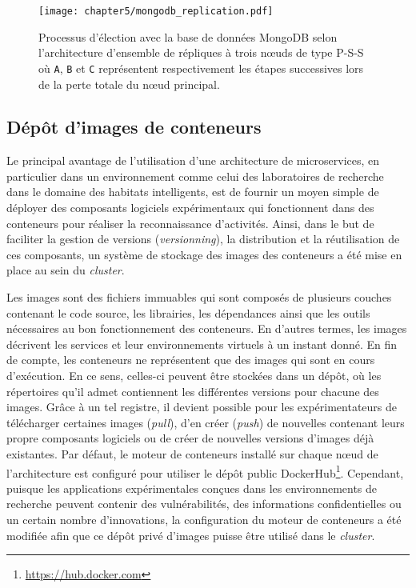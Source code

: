 \begin{figure}[H]
	\centering
	\texttt{[image: chapter5/mongodb\_replication.pdf]}
        \caption{Processus d'élection avec la base de données MongoDB selon l'architecture d'ensemble de répliques à trois n\oe{}uds de type P-S-S où \texttt{A}, \texttt{B} et \texttt{C} représentent respectivement les étapes successives lors de la perte totale du n\oe{}ud principal.}
	\label{fig:mongodb_replication}
\end{figure}

\subsection{Dépôt d'images de conteneurs}

Le principal avantage de l'utilisation d'une architecture de microservices, en particulier dans un environnement comme celui des laboratoires de recherche dans le domaine des habitats intelligents, est de fournir un moyen simple de déployer des composants logiciels expérimentaux qui fonctionnent dans des conteneurs pour réaliser la reconnaissance d'activités. Ainsi, dans le but de faciliter la gestion de versions (\textit{versionning}), la distribution et la réutilisation de ces composants, un système de stockage des images des conteneurs a été mise en place au sein du \textit{cluster}.

Les images sont des fichiers immuables qui sont composés de plusieurs couches contenant le code source, les librairies, les dépendances ainsi que les outils nécessaires au bon fonctionnement des conteneurs. En d'autres termes, les images décrivent les services et leur environnements virtuels à un instant donné. En fin de compte, les conteneurs ne représentent que des images qui sont en cours d'exécution. En ce sens, celles-ci peuvent être stockées dans un dépôt, où les répertoires qu'il admet contiennent les différentes versions pour chacune des images. Grâce à un tel registre, il devient possible pour les expérimentateurs de télécharger certaines images (\textit{pull}), d'en créer (\textit{push}) de nouvelles contenant leurs propre composants logiciels ou de créer de nouvelles versions d'images déjà existantes. Par défaut, le moteur de conteneurs installé sur chaque n\oe{}ud de l'architecture est configuré pour utiliser le dépôt public DockerHub\footnote{\url{https://hub.docker.com}}. Cependant, puisque les applications expérimentales conçues dans les environnements de recherche peuvent contenir des vulnérabilités, des informations confidentielles ou un certain nombre d'innovations, la configuration du moteur de conteneurs a été modifiée afin que ce dépôt privé d'images puisse être utilisé dans le \textit{cluster}.

